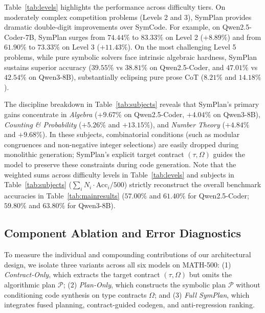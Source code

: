 \documentclass[conference,a4paper]{IEEEtran}
\begin{document}
Table~\ref{tab:levels} highlights the performance across difficulty tiers. On moderately complex competition problems (Levels 2 and 3), SymPlan provides dramatic double-digit improvements over SymCode. For example, on Qwen2.5-Coder-7B, SymPlan surges from $74.44\%$ to $83.33\%$ on Level 2 ($+8.89\%$) and from $61.90\%$ to $73.33\%$ on Level 3 ($+11.43\%$). On the most challenging Level 5 problems, while pure symbolic solvers face intrinsic algebraic hardness, SymPlan sustains superior accuracy ($39.55\%$ vs $38.81\%$ on Qwen2.5-Coder, and $47.01\%$ vs $42.54\%$ on Qwen3-8B), substantially eclipsing pure prose CoT ($8.21\%$ and $14.18\%$).

The discipline breakdown in Table~\ref{tab:subjects} reveals that SymPlan's primary gains concentrate in \textit{Algebra} ($+9.67\%$ on Qwen2.5-Coder, $+4.04\%$ on Qwen3-8B), \textit{Counting \& Probability} ($+5.26\%$ and $+13.15\%$), and \textit{Number Theory} ($+4.84\%$ and $+9.68\%$). In these subjects, combinatorial conditions (such as modular congruences and non-negative integer selections) are easily dropped during monolithic generation; SymPlan's explicit target contract $(\tau, \Omega)$ guides the model to preserve these constraints during code generation. Note that the weighted sums across difficulty levels in Table~\ref{tab:levels} and subjects in Table~\ref{tab:subjects} ($\sum_i N_i \cdot \text{Acc}_i / 500$) strictly reconstruct the overall benchmark accuracies in Table~\ref{tab:mainresults} ($57.00\%$ and $61.40\%$ for Qwen2.5-Coder; $59.80\%$ and $63.80\%$ for Qwen3-8B).
\subsection{Component Ablation and Error Diagnostics}
\label{sec:ablation}

To measure the individual and compounding contributions of our architectural design, we isolate three variants across all six models on MATH-500: (1) \textit{Contract-Only}, which extracts the target contract $(\tau, \Omega)$ but omits the algorithmic plan $\mathcal{P}$; (2) \textit{Plan-Only}, which constructs the symbolic plan $\mathcal{P}$ without conditioning code synthesis on type contracts $\Omega$; and (3) \textit{Full SymPlan}, which integrates fused planning, contract-guided codegen, and anti-regression ranking.
\end{document}
